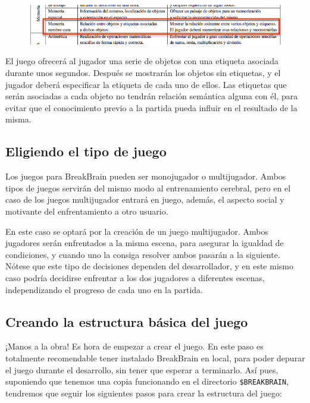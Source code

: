 \begin{figure}[H]
  \begin{center}
    \includegraphics[width=1\textwidth]{images/captura-nombre-cara.png}
  \end{center}
\end{figure}

El juego ofrecerá al jugador una serie de objetos con una etiqueta asociada durante unos segundos. Después se mostrarán los objetos sin etiquetas, y el jugador deberá especificar la etiqueta de cada uno de ellos. Las etiquetas que serán asociadas a cada objeto no tendrán relación semántica alguna con él, para evitar que el conocimiento previo a la partida pueda influir en el resultado de la misma.

\subsection{Eligiendo el tipo de juego}

Los juegos para BreakBrain pueden ser monojugador o multijugador. Ambos tipos de juegos servirán del mismo modo al entrenamiento cerebral, pero en el caso de los juegos multijugador entrará en juego, además, el aspecto social y motivante del enfrentamiento a otro usuario.

En este caso se optará por la creación de un juego multijugador. Ambos jugadores serán enfrentados a la misma escena, para asegurar la igualdad de condiciones, y cuando uno la consiga resolver ambos pasarán a la siguiente. Nótese que este tipo de decisiones dependen del desarrollador, y en este mismo caso podría decidirse enfrentar a los dos jugadores a diferentes escenas, independizando el progreso de cada uno en la partida.

\subsection{Creando la estructura básica del juego}

¡Manos a la obra! Es hora de empezar a crear el juego. En este paso es totalmente recomendable tener instalado BreakBrain en local, para poder depurar el juego durante el desarrollo, sin tener que esperar a terminarlo. Así pues, suponiendo que tenemos una copia funcionando en el directorio {\tt \$BREAKBRAIN}, tendremos que seguir los siguientes pasos para crear la estructura del juego:

